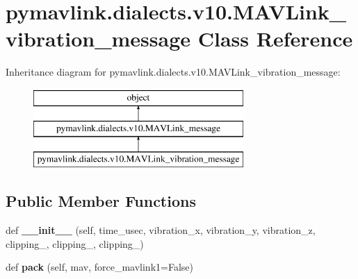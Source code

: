 \hypertarget{classpymavlink_1_1dialects_1_1v10_1_1MAVLink__vibration__message}{}\section{pymavlink.\+dialects.\+v10.\+M\+A\+V\+Link\+\_\+vibration\+\_\+message Class Reference}
\label{classpymavlink_1_1dialects_1_1v10_1_1MAVLink__vibration__message}
Inheritance diagram for pymavlink.\+dialects.\+v10.\+M\+A\+V\+Link\+\_\+vibration\+\_\+message\+:\begin{figure}[H]
\begin{center}
\leavevmode
\includegraphics[height=3.000000cm]{classpymavlink_1_1dialects_1_1v10_1_1MAVLink__vibration__message}
\end{center}
\end{figure}
\subsection*{Public Member Functions}
\begin{DoxyCompactItemize}
\item 
\mbox{\label{classpymavlink_1_1dialects_1_1v10_1_1MAVLink__vibration__message_ae835057e6d1d0e27669f0fed3f8d7821}} 
def {\bfseries \+\_\+\+\_\+init\+\_\+\+\_\+} (self, time\+\_\+usec, vibration\+\_\+x, vibration\+\_\+y, vibration\+\_\+z, clipping\+\_, clipping\+\_, clipping\+\_)
\item 
\mbox{\label{classpymavlink_1_1dialects_1_1v10_1_1MAVLink__vibration__message_a7ee68551289c13569344e247c37080a2}} 
def {\bfseries pack} (self, mav, force\+\_\+mavlink1=False)
\end{DoxyCompactItemize}
